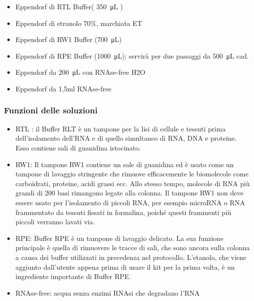 \begin{itemize}

\item Eppendorf di RTL Buffer( \SI{350}{\micro\liter} )
\item Eppendorf di etranolo 70\%, marchiata ET
\item Eppendorf di RW1 Buffer (\SI{700}{\micro\liter})
\item Eppendorf di RPE Buffer (\SI{1000}{\micro\liter}); servirà per due passaggi da \SI{500}{\micro\liter} cad.
\item Eppendorf da \SI{200}{\micro\liter} con RNAse-free H2O
\item Eppendorf da 1,5ml RNAse-free
\end{itemize}

\subsubsection{Funzioni delle soluzioni}

\begin{itemize}

\item RTL : il Buffer RLT è un tampone per la lisi di cellule e tessuti prima
dell'isolamento dell'RNA e di quello simultaneo di  RNA, DNA e proteine.
Esso contiene sali di guanidina istocinato.

\item RW1: Il tampone RW1 contiene un sale di guanidina ed è usato come un tampone
di lavaggio stringente che rimuove efficacemente le biomolecole come carboidrati, proteine, acidi grassi ecc.
Allo stesso tempo, molecole di RNA più grandi di 200 basi rimangono legate alla colonna.
Il tampone RW1 non deve essere usato per l'isolamento di piccoli RNA, per esempio microRNA o
RNA frammentato da tessuti fissati in formalina, poiché
questi frammenti più piccoli verranno lavati via.

\item RPE: Buffer RPE è un tampone di lavaggio delicato.
La sua funzione principale è quella di rimuovere le tracce di sali,
che sono ancora sulla colonna a causa dei buffer utilizzati in precedenza nel protocollo.
L'etanolo, che viene aggiunto dall'utente appena prima di usare il kit per la prima volta,
è un ingrediente importante di Buffer RPE.

\item RNAse-free: acqua senza enzimi RNAsi che degradano l'RNA
\end{itemize}

